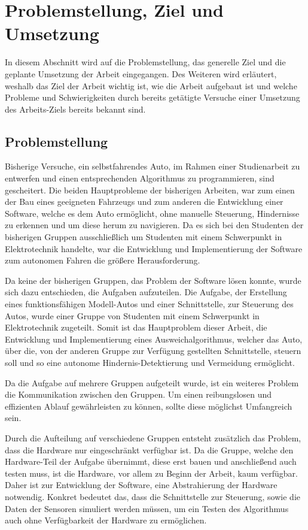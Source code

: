 \section{Problemstellung, Ziel und Umsetzung}
In diesem Abschnitt wird auf die Problemstellung, das generelle Ziel und die geplante Umsetzung der Arbeit eingegangen.
Des Weiteren wird erläutert, weshalb das Ziel der Arbeit wichtig ist, wie die Arbeit aufgebaut ist und welche Probleme und Schwierigkeiten durch bereits getätigte Versuche einer Umsetzung des Arbeits-Ziels bereits bekannt sind.

\subsection{Problemstellung}
Bisherige Versuche, ein selbstfahrendes Auto, im Rahmen einer Studienarbeit zu entwerfen und einen entsprechenden Algorithmus zu programmieren, sind gescheitert. 
Die beiden Hauptprobleme der bisherigen Arbeiten, war zum einen der Bau eines geeigneten Fahrzeugs und zum anderen die Entwicklung einer Software, welche es dem Auto ermöglicht, 
ohne manuelle Steuerung, Hindernisse zu erkennen und um diese herum zu navigieren.
Da es sich bei den Studenten der bisherigen Gruppen ausschließlich um Studenten mit einem Schwerpunkt in Elektrotechnik handelte, war die Entwicklung und Implementierung der Software zum autonomen Fahren die größere Herausforderung.

Da keine der bisherigen Gruppen, das Problem der Software lösen konnte, wurde sich dazu entschieden, die Aufgaben aufzuteilen. 
Die Aufgabe, der Erstellung eines funktionsfähigen Modell-Autos und einer Schnittstelle, zur Steuerung des Autos, wurde einer Gruppe von Studenten mit einem Schwerpunkt in Elektrotechnik zugeteilt. 
Somit ist das Hauptproblem dieser Arbeit, die Entwicklung und Implementierung eines Ausweichalgorithmus, 
welcher das Auto, über die, von der anderen Gruppe zur Verfügung gestellten Schnittstelle, steuern soll und so eine autonome Hindernis-Detektierung und Vermeidung ermöglicht.

Da die Aufgabe auf mehrere Gruppen aufgeteilt wurde, ist ein weiteres Problem die Kommunikation zwischen den Gruppen. 
Um einen reibungslosen und effizienten Ablauf gewährleisten zu können, sollte diese möglichst Umfangreich sein.

Durch die Aufteilung auf verschiedene Gruppen entsteht zusätzlich das Problem, dass die Hardware nur eingeschränkt verfügbar ist. 
Da die Gruppe, welche den Hardware-Teil der Aufgabe übernimmt, diese erst bauen und anschließend auch testen muss, ist die Hardware, vor allem zu Beginn der Arbeit, kaum verfügbar.
Daher ist zur Entwicklung der Software, eine Abstrahierung der Hardware notwendig. Konkret bedeutet das, dass die Schnitt\-stelle zur Steuerung, sowie die Daten der Sensoren simuliert werden müssen, 
um ein Testen des Algorithmus auch ohne Verfügbarkeit der Hardware zu ermöglichen.

